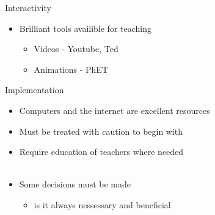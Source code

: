 \documentclass{beamer}
\begin{document}
\begin{frame}{Interactivity}
    \begin{itemize}
        \item Brilliant tools availible for teaching
        \begin{itemize}
            \item Videos - Youtube, Ted
            \item Animations - PhET
        \end{itemize}
    \end{itemize}
\end{frame}

\begin{frame}{Implementation}
    \begin{itemize}
        \item Computers and the internet are excellent resources
        \item Must be treated with caution to begin with
        \item Require education of teachers where needed \\~\\
        \item Some decisions must be made
        \begin{itemize}
                \item is it always nessessary and beneficial
        \end{itemize}
    \end{itemize}
\end{frame}
\end{document}
